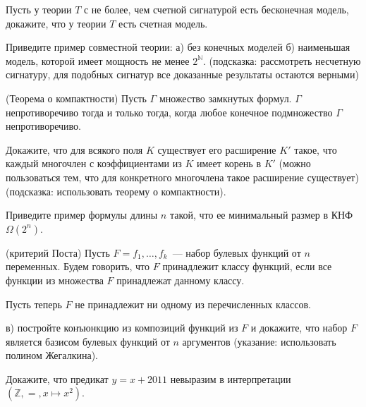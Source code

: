 \setcounter{curtask}{47}


\begin{task}
    Пусть у теории $T$ с не более, чем счетной сигнатурой есть
	бесконечная модель, докажите, что у теории $T$ есть счетная
    модель.
\end{task}

\begin{task}
    Приведите пример совместной теории:
    а) без конечных моделей
    б) наименьшая модель, которой имеет мощность не менее
    $2^{\mathbb{N}}$. (подсказка: рассмотреть несчетную сигнатуру,
    для подобных сигнатур все доказанные результаты остаются верными)
\end{task}

(Теорема о компактности)
	Пусть $\Gamma$ множество замкнутых формул. $\Gamma$
    непротиворечиво тогда и только тогда, когда любое конечное
    подмножество $\Gamma$ непротиворечиво.
    
\begin{task}
    Докажите, что для всякого поля $K$ существует его расширение $K'$
    такое, что каждый многочлен с коэффициентами из $K$ имеет корень
    в $K'$ (можно пользоваться тем, что для конкретного многочлена
    такое расширение существует) (подсказка: использовать теорему о
	компактности).
\end{task}

\breakline

\begin{ptask}{34}
    Приведите пример формулы длины $n$ такой, что ее минимальный
    размер в КНФ $\Omega(2^n)$.
\end{ptask}

\begin{ptask}{37} (критерий Поста)
	Пусть $F = {f_1, \dots, f_k}$~--- набор булевых функций от $n$
    переменных. Будем говорить, что $F$ принадлежит классу функций,
    если все функции из множества $F$ принадлежат данному классу.
    
    Пусть теперь $F$ не принадлежит ни одному из перечисленных
    классов.

    в) постройте конъюнкцию из композиций функций из $F$ и докажите,
    что набор $F$ является базисом булевых функций от $n$ аргументов
    (указание: использовать полином Жегалкина).

\end{ptask}

\begin{ptask}{40}
    Докажите, что предикат $y = x + 2011$ невыразим в интерпретации
    $(\mathbb{Z}, =, x \mapsto x^2)$.
\end{ptask}


